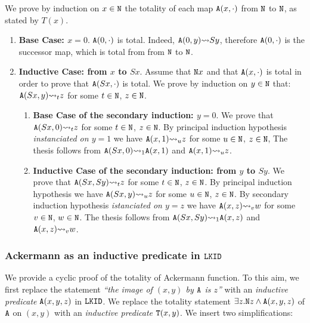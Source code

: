 \documentclass[a4paper,12pt]{article}
\newenvironment{proof}[1][Proof]{\begin{trivlist}
\item[\hskip \labelsep {\bfseries #1}]}{\end{trivlist}}
\newcommand{\Nat}               { {\tt N}  }
\newcommand{\reduces}         { {\leadsto} }
\newcommand{\Tot}           { {\tt T} }
\newcommand{\Ack}   {{\tt A}}
\newcommand{\LKID} { {\tt LKID} }
\begin{document}
\begin{proof}
We prove by induction on $x \in \Nat$ the totality of each map
$\Ack(x,\cdot)$ from $\Nat$ to $\Nat$, as stated by $T(x)$. %

\begin{enumerate}
\item
{\bf Base Case: $x=0$}. $\Ack(0,\cdot)$ is total. Indeed, $\Ack(0,y) \reduces Sy$, therefore
$\Ack(0,\cdot)$ is the successor map, which is total from from $\Nat$ to $\Nat$.

\item
{\bf Inductive Case: from $x$ to $Sx$}. 
Assume that $\Nat x$ and that $\Ack(x,\cdot)$ is total in order to prove that
$\Ack(Sx,\cdot)$ is total. We prove by induction on $y \in \Nat$ that: 
$\Ack(Sx,y) \reduces_t z$ for some $t \in \Nat $, $z \in \Nat$. 

\begin{enumerate}
\item
{\bf Base Case of the secondary induction: $y=0$}.
We prove that $\Ack(Sx,0) \reduces_t z$ for some $t \in \Nat$, $z \in \Nat$.
By principal induction hypothesis \emph{instanciated on $y=1$} 
we have $\Ack(x,1) \reduces_u z$ for some $u \in \Nat$, $z \in \Nat$, 
The thesis follows from $\Ack(Sx,0) \reduces_1 \Ack(x,1)$ and $\Ack(x,1) \reduces_u z$.

\item
{\bf Inductive Case of the secondary induction: from $y$ to $Sy$}.
We prove that $\Ack(Sx,Sy) \reduces_t z$ 
for some $t \in \Nat$, $z \in \Nat$. 
By principal induction hypothesis we have $\Ack(Sx,y) \reduces_u z$ for some 
$u \in \Nat$, $z \in \Nat$. 
By secondary induction hypothesis \emph{istanciated on $y=z$} 
we have $\Ack(x,z) \reduces_v w$ for some $v \in \Nat$, $w \in \Nat$. 
The thesis follows from 
$\Ack(Sx,Sy) \reduces_1 \Ack(x,z)$ and $\Ack(x,z) \reduces_v w$.

\end{enumerate}
\end{enumerate} 
\end{proof}

\subsubsection{Ackermann as an inductive predicate in $\LKID$}
\label{subsubsection-ackermann-inductive}
We provide a cyclic proof of the totality of Ackermann function. To this aim,
we first replace the 
statement \emph{``the image of $(x,y)$ by $\Ack$ is $z$''}
with an \emph{inductive predicate} $\Ack(x,y,z)$ in $\LKID$. We replace the totality
statement $\exists z. \Nat z \wedge \Ack(x,y,z)$ of $\Ack$ on $(x,y)$
with an \emph{inductive predicate} $\Tot(x,y)$. We insert two simplifications:
\end{document}
